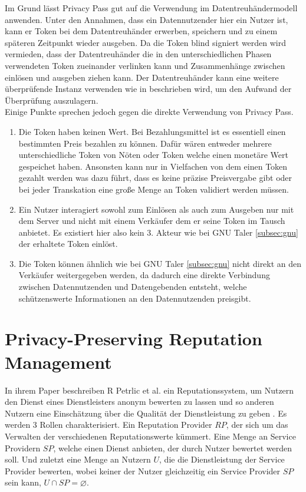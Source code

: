\documentclass[11pt,a4paper]{scrreprt}
\begin{document}
Im Grund lässt Privacy Pass gut auf die Verwendung im Datentreuhändermodell anwenden. Unter den Annahmen, dass ein Datennutzender hier ein Nutzer ist, kann er Token bei dem Datentreuhänder erwerben, speichern und zu einem späteren Zeitpunkt wieder ausgeben. Da die Token blind signiert werden wird vermieden, dass der Datentreuhänder die in den unterschiedlichen Phasen verwendeten Token zueinander verlinken kann und Zusammenhänge zwischen einlösen und ausgeben ziehen kann. Der Datentreuhänder kann eine weitere überprüfende Instanz verwenden wie in \cite{pp-davidson2018privacy} beschrieben wird, um den Aufwand der Überprüfung auszulagern. \\
Einige Punkte sprechen jedoch gegen die direkte Verwendung von Privacy Pass. 
\begin{enumerate}
    \item Die Token haben keinen Wert. Bei Bezahlungsmittel ist es essentiell einen bestimmten Preis bezahlen zu können. Dafür wären entweder mehrere unterschiedliche Token von Nöten oder Token welche einen monetäre Wert gespeichet haben. Ansonsten kann nur in Vielfachen von dem einen Token gezahlt werden was dazu führt, dass es keine präzise Preisvergabe gibt oder bei jeder Transkation eine große Menge an Token validiert werden müssen.
    \item Ein Nutzer interagiert sowohl zum Einlösen als auch zum Ausgeben nur mit dem Server und nicht mit einem Verkäufer dem er seine Token im Tausch anbietet. Es existiert hier also kein 3. Akteur wie bei GNU Taler \ref{subsec:gnu} der erhaltete Token einlöst.
    \item Die Token können ähnlich wie bei GNU Taler \ref{subsec:gnu} nicht direkt an den Verkäufer weitergegeben werden, da dadurch eine direkte Verbindung zwischen Datennutzenden und Datengebenden entsteht, welche schützenswerte Informationen an den Datennutzenden preisgibt.
\end{enumerate}

\section{Privacy-Preserving Reputation Management}
\label{subsec:rep}
In ihrem Paper beschreiben R Petrlic et al. ein Reputationssystem, um Nutzern den Dienst eines Dienstleisters anonym bewerten zu lassen und so anderen Nutzern eine Einschätzung über die Qualität der Dienstleistung zu geben \cite{petrlic2014privacy}. Es werden 3 Rollen charakterisiert. Ein Reputation Provider $RP$, der sich um das Verwalten der verschiedenen Reputationswerte kümmert. Eine Menge an Service Providern $SP$, welche einen Dienst anbieten, der durch Nutzer bewertet werden soll. Und zuletzt eine Menge an Nutzern $U$, die die Dienstleistung der Service Provider bewerten, wobei keiner der Nutzer gleichzeitig ein Service Provider $SP$ sein kann, $U \cap SP = \varnothing$. 
\end{document}

